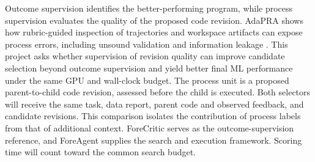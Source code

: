 \documentclass{article}
\begin{document}
Outcome supervision identifies the better-performing program, while process supervision evaluates the quality of the proposed code revision. AdaPRA shows how rubric-guided inspection of trajectories and workspace artifacts can expose process errors, including unsound validation and information leakage \citep[Section~3.4]{naik2026adapra}. This project asks whether supervision of revision quality can improve candidate selection beyond outcome supervision and yield better final ML performance under the same GPU and wall-clock budget. The process unit is a proposed parent-to-child code revision, assessed before the child is executed. Both selectors will receive the same task, data report, parent code and observed feedback, and candidate revisions. This comparison isolates the contribution of process labels from that of additional context. ForeCritic serves as the outcome-supervision reference, and ForeAgent supplies the search and execution framework. Scoring time will count toward the common search budget.






\FloatBarrier

\end{document}
